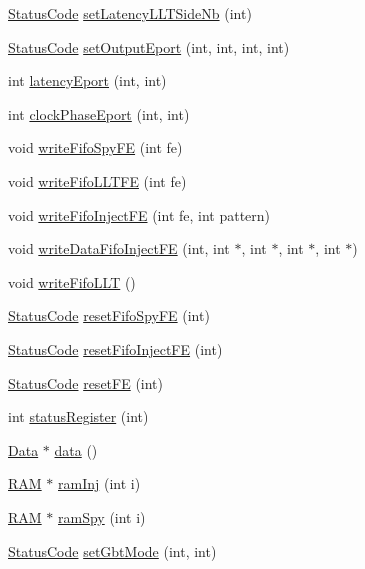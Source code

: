 \begin{DoxyCompactItemize}
\hyperlink{classStatusCode}{Status\+Code} \hyperlink{classFEB__v1_a840532b78d0062646116a076e65cf353}{set\+Latency\+L\+L\+T\+Side\+Nb} (int)
\item 
\hyperlink{classStatusCode}{Status\+Code} \hyperlink{classFEB__v1_ae8ed47630ca1408647e3eb5c1dfa0ec0}{set\+Output\+Eport} (int, int, int, int)
\item 
int \hyperlink{classFEB__v1_a8ab1ff429d357779d682bdf28504bdd2}{latency\+Eport} (int, int)
\item 
int \hyperlink{classFEB__v1_aab32d0b274dfb55f1c2894ff3d08eaba}{clock\+Phase\+Eport} (int, int)
\item 
void \hyperlink{classFEB__v1_a0fd77cbaae9ae853e5c4dfc81b4462a5}{write\+Fifo\+Spy\+FE} (int fe)
\item 
void \hyperlink{classFEB__v1_a9dbedaebc2e3569e8b5fc0be782dbce3}{write\+Fifo\+L\+L\+T\+FE} (int fe)
\item 
void \hyperlink{classFEB__v1_ae212b0e4c9824afaebb4508b688f94bf}{write\+Fifo\+Inject\+FE} (int fe, int pattern)
\item 
void \hyperlink{classFEB__v1_a0afafcfdea15d3268284203a90c67572}{write\+Data\+Fifo\+Inject\+FE} (int, int $\ast$, int $\ast$, int $\ast$, int $\ast$)
\item 
void \hyperlink{classFEB__v1_a0e88b14453100c97b5962e8a6b0f48bf}{write\+Fifo\+L\+LT} ()
\item 
\hyperlink{classStatusCode}{Status\+Code} \hyperlink{classFEB__v1_ab02c292e29e01079bb9b268acbc782b1}{reset\+Fifo\+Spy\+FE} (int)
\item 
\hyperlink{classStatusCode}{Status\+Code} \hyperlink{classFEB__v1_a71d10a772bda2506fd7adb86739fb24d}{reset\+Fifo\+Inject\+FE} (int)
\item 
\hyperlink{classStatusCode}{Status\+Code} \hyperlink{classFEB__v1_ae351e55f3d8e8f936c324ffbda6816bf}{reset\+FE} (int)
\item 
int \hyperlink{classFEB__v1_aa98b8e0bcc4d6d03f4b365de786f5c95}{status\+Register} (int)
\item 
\hyperlink{classData}{Data} $\ast$ \hyperlink{classFEB__v1_a6bca4320bd3bbbc32efc81097f33421a}{data} ()
\item 
\hyperlink{classRAM}{R\+AM} $\ast$ \hyperlink{classFEB__v1_aceff066f476794fefe2712e43bc2d6d2}{ram\+Inj} (int i)
\item 
\hyperlink{classRAM}{R\+AM} $\ast$ \hyperlink{classFEB__v1_ac59216f094007ede67d49bd23287be73}{ram\+Spy} (int i)
\item 
\hyperlink{classStatusCode}{Status\+Code} \hyperlink{classFEB__v1_a849040ff2fa8275b1a47e7be3915ebf4}{set\+Gbt\+Mode} (int, int)

\end{DoxyCompactItemize}
